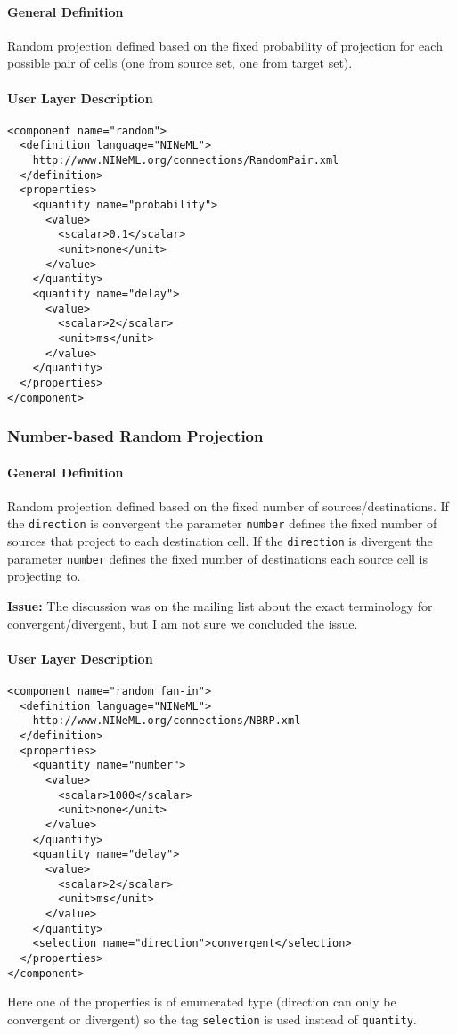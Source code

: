 \documentclass{article}
\newcommand{\issue}[1]{%
\begin{center}
\colorbox{issuecolor}{\parbox{0.8\linewidth}{\textbf{Issue:} #1}}
\end{center}%
}
\begin{document}
\paragraph{General Definition}
Random projection defined based on the fixed probability of projection for
each possible pair of cells (one from source set, one from target set).


\paragraph{User Layer Description}
\begin{verbatim}
<component name="random">
  <definition language="NINeML">
    http://www.NINeML.org/connections/RandomPair.xml
  </definition>
  <properties>
    <quantity name="probability">
      <value>
        <scalar>0.1</scalar>
        <unit>none</unit>
      </value>
    </quantity>
    <quantity name="delay">
      <value>
        <scalar>2</scalar>
        <unit>ms</unit>
      </value>
    </quantity>
  </properties>
</component>
\end{verbatim}

\subsubsection{Number-based Random Projection}

\paragraph{General Definition}
Random projection defined based on the fixed number of sources/destinations. If
the {\tt direction} is convergent the parameter {\tt number} defines the fixed
number of sources that project to each destination cell. If the {\tt direction}
is divergent the parameter {\tt number} defines the fixed number of destinations
each source cell is projecting to.

\issue{The discussion was on the mailing list about the exact terminology for
convergent/divergent, but I am not sure we concluded the issue.}

\paragraph{User Layer Description}
\begin{verbatim}
<component name="random fan-in">
  <definition language="NINeML">
    http://www.NINeML.org/connections/NBRP.xml
  </definition>
  <properties>
    <quantity name="number">
      <value>
        <scalar>1000</scalar>
        <unit>none</unit>
      </value>
    </quantity>
    <quantity name="delay">
      <value>
        <scalar>2</scalar>
        <unit>ms</unit>
      </value>
    </quantity>
    <selection name="direction">convergent</selection>
  </properties>
</component>
\end{verbatim}
Here one of the properties is of enumerated type (direction can only be convergent or
divergent) so the tag {\tt selection} is used instead of {\tt quantity}.
\end{document}
